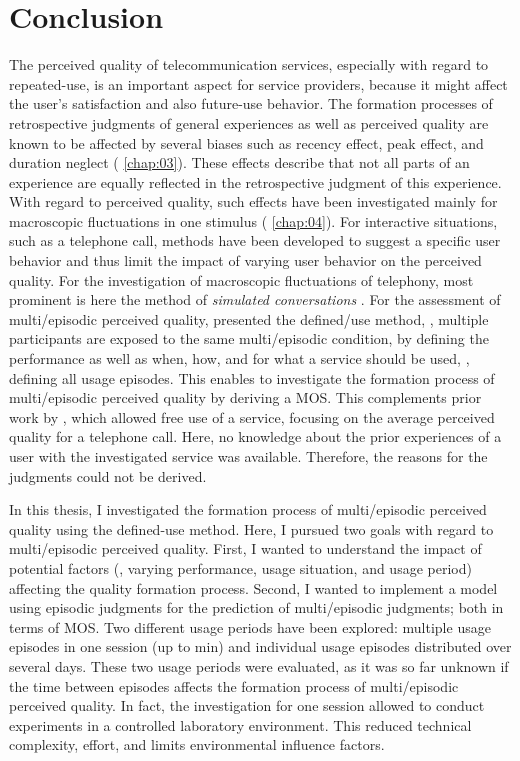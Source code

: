 \chapter{Conclusion}\label{chap:discussion}
The perceived quality of telecommunication services, especially with regard to repeated-use, is an important aspect for service providers, because it might affect the user's satisfaction and also future-use behavior.
The formation processes of retrospective judgments of general experiences as well as perceived quality are known to be affected by several biases such as recency effect, peak effect, and duration neglect (\cf{} \autoref{chap:03}).
These effects describe that not all parts of an experience are equally reflected in the retrospective judgment of this experience.
With regard to perceived quality, such effects have been investigated mainly for macroscopic fluctuations in one stimulus (\cf{} \autoref{chap:04}).
For interactive situations, such as a telephone call, methods have been developed to suggest a specific user behavior and thus limit the impact of varying user behavior on the perceived quality.
For the investigation of macroscopic fluctuations of telephony, most prominent is here the method of \emph{simulated conversations} \citep{weiss_modeling_2009}.
For the assessment of multi\-/episodic perceived quality, \citet{moller_single-call_2011} presented the defined\-/use method, \ie, multiple participants are exposed to the same multi\-/episodic condition, by defining the performance as well as when, how, and for what a service should be used, \ie, defining all usage episodes.
This enables to investigate the formation process of multi\-/episodic perceived quality by deriving a \ac{MOS}.
This complements prior work by \citet{duncanson_average_1969}, which allowed free use of a service, focusing on the average perceived quality for a telephone call.
Here, no knowledge about the prior experiences of a user with the investigated service was available.
Therefore, the reasons for the judgments could not be derived.

In this thesis, I investigated the formation process of multi\-/episodic perceived quality using the  defined-use method.
Here, I pursued two goals with regard to multi\-/episodic perceived quality.
First, I wanted to understand the impact of potential factors (\ie, varying performance, usage situation, and usage period) affecting the quality formation process.
Second, I wanted to implement a model using episodic judgments for the prediction of multi\-/episodic judgments; both in terms of \ac{MOS}.
Two different usage periods have been explored: multiple usage episodes in one session (up to \unit[45]{min}) and individual usage episodes distributed over several days.
These two usage periods were evaluated, as it was so far unknown if the time between episodes affects the formation process of multi\-/episodic perceived quality.
In fact, the investigation for one session allowed to conduct experiments in a controlled laboratory environment.
This reduced technical complexity, effort, and limits environmental influence factors.

